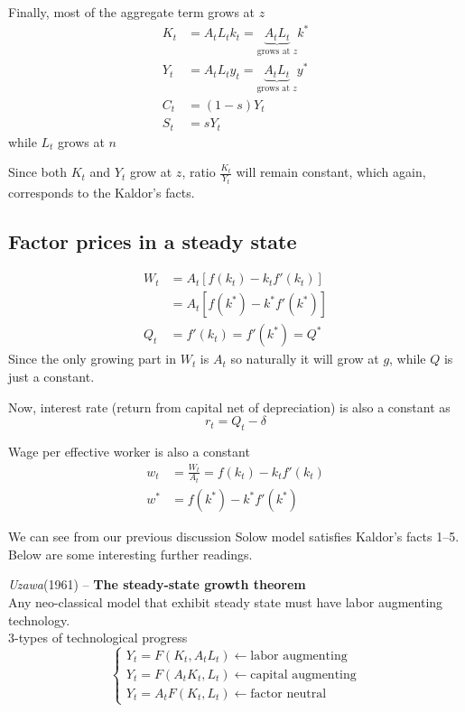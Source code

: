 \documentclass[twocolumn, fleqn]{article}
\begin{document}
			Finally, most of the aggregate term grows at $z$
			\begin{align*}
				K_t &= A_t L_t k_t = \underbrace{A_t L_t}_{\text{grows at } z} k^{\ast}\\
				Y_t &= A_t L_t y_t = \underbrace{A_t L_t}_{\text{grows at } z} y^{\ast}\\
				C_t &= (1-s)Y_t\\
				S_t &= sY_t
			\end{align*}
			while $L_t$ grows at $n$

			Since both $K_t$ and $Y_t$ grow at $z$, ratio $\frac{K_t}{Y_t}$ will remain constant, which again,
			corresponds to the Kaldor's facts.

		\subsection{Factor prices in a steady state}
			\begin{align*}
				W_t & = A_t [f(k_t)-k_t f'(k_t)]\\
				&= A_t [f(k^\ast)-k^\ast f'(k^\ast)]\\
				Q_t &= f'(k_t) = f'(k^\ast) = Q^{\ast}
			\end{align*}
			Since the only growing part in $W_t$ is $A_t$ so naturally it will grow at $g$, while $Q$ is just a
			constant.

			Now, interest rate (return from capital net of depreciation) is also a constant as
			\[r_t = Q_t -\delta \]

			Wage per effective worker is also a constant
			\begin{align*}
				w_t &=\frac{W_t}{A_t}=f(k_t)-k_t f'(k_t)\\
				w^{\ast} &= f(k^\ast) - k^{\ast} f'(k^\ast)
			\end{align*}

			We can see from our previous discussion Solow model satisfies Kaldor's facts 1--5.
			Below are some interesting further readings.

			\textit{Uzawa}(1961) -- \textbf{The steady-state growth theorem}\\
				Any neo-classical model that exhibit steady state must have labor augmenting technology.\\

			3-types of technological progress
			\[
			\begin{cases}
				Y_t = F(K_t, A_tL_t) \leftarrow \text{labor augmenting}\\
				Y_t = F(A_tK_t, L_t) \leftarrow \text{capital augmenting}\\
				Y_t = A_tF(K_t, L_t) \leftarrow \text{factor neutral}
			\end{cases}\]\\
\end{document}
